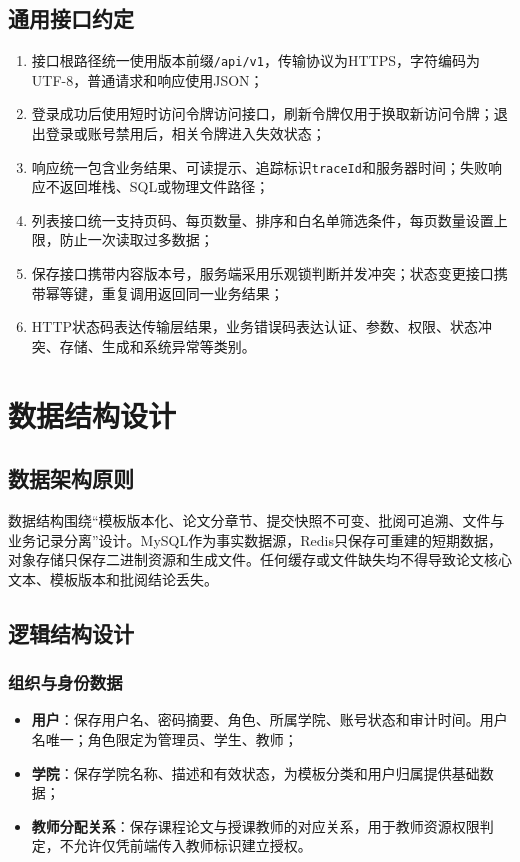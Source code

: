\documentclass{../template/softeng}
\begin{document}
	\subsection{通用接口约定}
	\begin{enumerate}
		\item 接口根路径统一使用版本前缀\texttt{/api/v1}，传输协议为HTTPS，字符编码为UTF-8，普通请求和响应使用JSON；
		\item 登录成功后使用短时访问令牌访问接口，刷新令牌仅用于换取新访问令牌；退出登录或账号禁用后，相关令牌进入失效状态；
		\item 响应统一包含业务结果、可读提示、追踪标识\texttt{traceId}和服务器时间；失败响应不返回堆栈、SQL或物理文件路径；
		\item 列表接口统一支持页码、每页数量、排序和白名单筛选条件，每页数量设置上限，防止一次读取过多数据；
		\item 保存接口携带内容版本号，服务端采用乐观锁判断并发冲突；状态变更接口携带幂等键，重复调用返回同一业务结果；
		\item HTTP状态码表达传输层结果，业务错误码表达认证、参数、权限、状态冲突、存储、生成和系统异常等类别。
	\end{enumerate}
	
	\section{数据结构设计}
	
	\subsection{数据架构原则}
	数据结构围绕“模板版本化、论文分章节、提交快照不可变、批阅可追溯、文件与业务记录分离”设计。MySQL作为事实数据源，Redis只保存可重建的短期数据，对象存储只保存二进制资源和生成文件。任何缓存或文件缺失均不得导致论文核心文本、模板版本和批阅结论丢失。
	
	\subsection{逻辑结构设计}
	\subsubsection{组织与身份数据}
	\begin{itemize}
		\item \textbf{用户}：保存用户名、密码摘要、角色、所属学院、账号状态和审计时间。用户名唯一；角色限定为管理员、学生、教师；
		\item \textbf{学院}：保存学院名称、描述和有效状态，为模板分类和用户归属提供基础数据；
		\item \textbf{教师分配关系}：保存课程论文与授课教师的对应关系，用于教师资源权限判定，不允许仅凭前端传入教师标识建立授权。
	\end{itemize}
	
\end{document}
